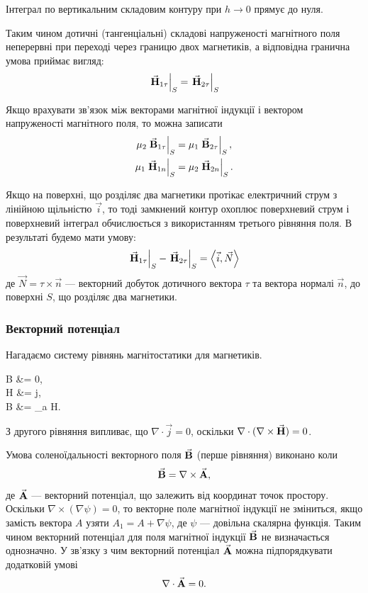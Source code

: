 Інтеграл по вертикальним складовим контуру при $h \to 0$ прямує до нуля. \medskip

Таким чином дотичні (тангенціальні) складові напруженості магнітного поля неперервні при переході через границю двох магнетиків, а відповідна гранична умова приймає вигляд:
\begin{equation}
	\left. {\vec{\mathbf{H}}}_{1\tau} \right|_S = \left. {\vec{\mathbf{H}}}_{2\tau} \right|_S
\end{equation}

Якщо врахувати зв'язок між векторами магнітної індукції і вектором напруженості магнітного поля, то можна записати
\begin{align}
	\mu_2 \left. {\vec{\mathbf{B}}}_{1\tau} \right|_S &= \mu_1 \left. {\vec{\mathbf{B}}}_{2\tau} \right|_S, \\
	\mu_1 \left. {\vec{\mathbf{H}}}_{1n} \right|_S &= \mu_2 \left. {\vec{\mathbf{H}}}_{2n} \right|_S.
\end{align}

Якщо на поверхні, що розділяє два магнетики протікає електричний струм з лінійною щільністю $\vec i$, то тоді замкнений контур охоплює поверхневий струм і поверхневий інтеграл обчислюється з використанням третього рівняння поля. В результаті будемо мати умову:
\begin{equation}
	\left. \vecf H_{1\tau} \right|_S - \left. \vecf H_{2\tau} \right|_S = \langle \vec i, \vec N \rangle
\end{equation}
де $\vec N = \tau \times \vec n$ --- векторний добуток дотичного вектора $\tau$ та вектора нормалі $\vec n$, до поверхні $S$, що розділяє два магнетики.

\subsubsection{Векторний потенціал}

Нагадаємо систему рівнянь магнітостатики для магнетиків.
\begin{system}
	\nabla \cdot \vecf B &= 0, \\
	\nabla \times \vecf H &= \vec j, \\
	\vecf B &= \mu_a \vecf H.
\end{system}

З другого рівняння випливає, що $\nabla \cdot \vec j = 0$, оскільки $\nabla \cdot (\nabla \times {\vec{\mathbf{H}}}) = 0$. \medskip

Умова соленоїдальності векторного поля ${\vec{\mathbf{B}}}$ (перше рівняння) виконано коли
\begin{equation}
	{\vec{\mathbf{B}}} = \nabla \times {\vec{\mathbf{A}}},
\end{equation}
де ${\vec{\mathbf{A}}}$ --- векторний потенціал, що залежить від координат точок простору. Оскільки $\nabla \times (\nabla \psi) = 0$, то векторне поле магнітної індукції не зміниться, якщо замість вектора $A$ узяти $A_1 = A + \nabla \psi$, де $\psi$ --- довільна скалярна функція. Таким чином векторний потенціал для поля магнітної індукції ${\vec{\mathbf{B}}}$ не визначається однозначно. У зв'язку з чим векторний потенціал ${\vec{\mathbf{A}}}$ можна підпорядкувати додатковій умові
\begin{equation}
	\nabla \cdot {\vec{\mathbf{A}}} = 0.	
\end{equation}

